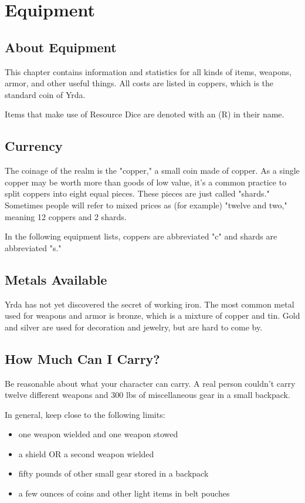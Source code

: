 \chapter{Equipment}

\section{About Equipment}

This chapter contains information and statistics for all kinds
of items, weapons, armor, and other useful things. All costs
are listed in coppers, which is the standard coin of Yrda.

Items that make use of Resource Dice are denoted with an (R) in their name.

\section{Currency}

The coinage of the realm is the "copper," a small coin made of copper.
As a single copper may be worth more than goods of low value, it's a
common practice to split coppers into eight equal pieces. These pieces
are just called "shards." Sometimes people will refer to mixed prices as
(for example) "twelve and two," meaning 12 coppers and 2 shards.

In the following equipment lists, coppers are abbreviated "c" and shards are
abbreviated "s."

\section{Metals Available}

Yrda has not yet discovered the secret of working iron. The most common metal used
for weapons and armor is bronze, which is a mixture of copper and tin. Gold and
silver are used for decoration and jewelry, but are hard to come by.

\section{How Much Can I Carry?}

Be reasonable about what your character can carry. A real person
couldn't carry twelve different weapons and 300 lbs of miscellaneous
gear in a small backpack.

In general, keep close to the following limits:

\begin{itemize}
  \item one weapon wielded and one weapon stowed
  \item a shield OR a second weapon wielded
  \item fifty pounds of other small gear stored in a backpack
  \item a few ounces of coins and other light items in belt pouches
\end{itemize}


